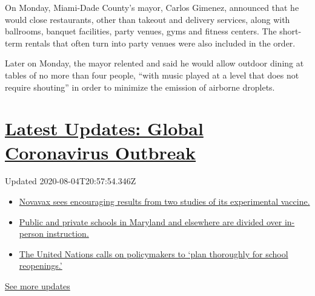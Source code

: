 On Monday, Miami-Dade County's mayor, Carlos Gimenez, announced that he
would close restaurants, other than takeout and delivery services, along
with ballrooms, banquet facilities, party venues, gyms and fitness
centers. The short-term rentals that often turn into party venues were
also included in the order.

Later on Monday, the mayor relented and said he would allow outdoor
dining at tables of no more than four people, ``with music played at a
level that does not require shouting'' in order to minimize the emission
of airborne droplets.

\hypertarget{latest-updates-global-coronavirus-outbreak}{%
\section{\texorpdfstring{\href{https://www.nytimes.com/2020/08/04/world/coronavirus-cases.html?action=click\&pgtype=Article\&state=default\&region=MAIN_CONTENT_1\&context=storylines_live_updates}{Latest
Updates: Global Coronavirus
Outbreak}}{Latest Updates: Global Coronavirus Outbreak}}\label{latest-updates-global-coronavirus-outbreak}}

Updated 2020-08-04T20:57:54.346Z

\begin{itemize}
\tightlist
\item
  \href{https://www.nytimes.com/2020/08/04/world/coronavirus-cases.html?action=click\&pgtype=Article\&state=default\&region=MAIN_CONTENT_1\&context=storylines_live_updates\#link-1228a480}{Novavax
  sees encouraging results from two studies of its experimental
  vaccine.}
\item
  \href{https://www.nytimes.com/2020/08/04/world/coronavirus-cases.html?action=click\&pgtype=Article\&state=default\&region=MAIN_CONTENT_1\&context=storylines_live_updates\#link-4825b93}{Public
  and private schools in Maryland and elsewhere are divided over
  in-person instruction.}
\item
  \href{https://www.nytimes.com/2020/08/04/world/coronavirus-cases.html?action=click\&pgtype=Article\&state=default\&region=MAIN_CONTENT_1\&context=storylines_live_updates\#link-50f7386d}{The
  United Nations calls on policymakers to `plan thoroughly for school
  reopenings.'}
\end{itemize}

\href{https://www.nytimes.com/2020/08/04/world/coronavirus-cases.html?action=click\&pgtype=Article\&state=default\&region=MAIN_CONTENT_1\&context=storylines_live_updates}{See
more updates}

